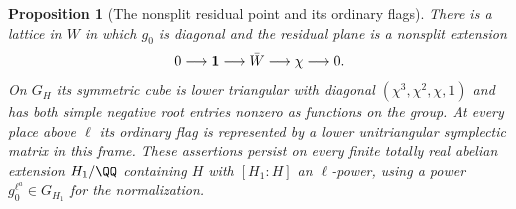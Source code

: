 \documentclass[a4paper,11pt]{article}
\newtheorem{proposition}{Proposition}[section]
\theoremstyle{definition}
\theoremstyle{remark}
\numberwithin{equation}{section}
\begin{document}
\begin{proposition}[The nonsplit residual point and its ordinary flags]
\leavevmode\label{prop:residualcube577}
There is a lattice in \(W\) in which \(g_0\) is diagonal and
the residual plane is a nonsplit extension
\[
             0\longrightarrow {\bf1}\longrightarrow\bar W
                           \longrightarrow\chi\longrightarrow0 .
\]
On \(G_H\) its symmetric cube is lower triangular with
diagonal \((\chi^3,\chi^2,\chi,1)\) and has both simple
negative root entries nonzero as functions on the group.
At every place above \(\ell\) its ordinary flag is represented
by a lower unitriangular symplectic matrix in this frame.
These assertions persist on every finite totally real abelian
extension \(H_1/\QQ\) containing \(H\) with
\([H_1:H]\) an \(\ell\)-power, using a power
\(g_0^{\ell^a}\in G_{H_1}\) for the normalization.
\end{proposition}
\end{document}
